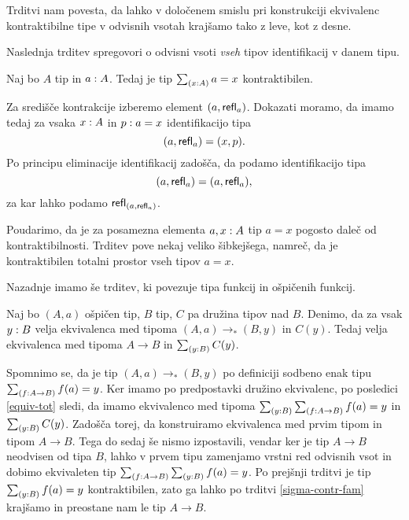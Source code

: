 Trditvi nam povesta, da lahko v določenem smislu pri konstrukciji ekvivalenc kontraktibilne tipe v odvisnih vsotah krajšamo tako z leve, kot z desne.

Naslednja trditev spregovori o odvisni vsoti \emph{vseh} tipov identifikacij v danem tipu.

\begin{trditev}
  \label{cover-contr}
  Naj bo \(A\) tip in \(a : A\). Tedaj je tip \(\textstyle \sum_{\left( x : A \right)} a = x\) kontraktibilen.
\end{trditev}

\begin{dokaz}
  Za središče kontrakcije izberemo element \((a, \textnormal{\textsf{refl}}_{a})\). Dokazati moramo, da imamo tedaj za vsaka \(x : A\) in \(p : a = x\) identifikacijo tipa
  \[(a, \textnormal{\textsf{refl}}_{a}) = (x, p).\]
  Po principu eliminacije identifikacij zadošča, da podamo identifikacijo tipa
  \[(a, \textnormal{\textsf{refl}}_{a}) = (a, \textnormal{\textsf{refl}}_{a}),\] za kar lahko podamo \(\textnormal{\textsf{refl}}_{(a, \textnormal{\textsf{refl}}_{a})}\).
\end{dokaz}

Poudarimo, da je za posamezna elementa \(a, x : A\) tip \(a = x\) pogosto daleč od kontraktibilnosti. Trditev pove nekaj veliko šibkejšega, namreč, da je kontraktibilen totalni prostor vseh tipov \(a = x\).

Nazadnje imamo še trditev, ki povezuje tipa funkcij in ošpičenih funkcij.

\begin{trditev}
  \label{pointed-map-family}
  Naj bo \((A, a)\) ošpičen tip, \(B\) tip, \(C\) pa družina tipov nad \(B\).
  Denimo, da za vsak \(y : B\) velja ekvivalenca med tipoma \((A, a) \to_{\ast} (B, y)\) in \(C(y)\). Tedaj velja ekvivalenca med tipoma \(A \to B\) in \(\textstyle \sum_{\left( y : B \right)} C(y)\).
\end{trditev}

\begin{dokaz}
  Spomnimo se, da je tip \((A, a) \to_{\ast} (B, y)\) po definiciji sodbeno enak tipu \(\textstyle \sum_{\left( f : A \to B \right)} f(a) = y\). Ker imamo po predpostavki družino ekvivalenc, po posledici \ref{equiv-tot} sledi, da imamo ekvivalenco med tipoma \(\textstyle \sum_{\left( y : B \right)} \textstyle \sum_{\left( f : A \to B \right)} f(a) = y\) in \(\textstyle \sum_{\left( y : B \right)} C(y)\).
  Zadošča torej, da konstruiramo ekvivalenca med prvim tipom in tipom \(A \to B\).
  Tega do sedaj še nismo izpostavili, vendar ker je tip \(A \to B\) neodvisen od tipa \(B\), lahko v prvem tipu zamenjamo vrstni red odvisnih vsot in dobimo ekvivaleten tip \(\textstyle \sum_{\left( f : A \to B \right)} \textstyle \sum_{\left( y : B \right)} f(a) = y\). Po prejšnji trditvi je tip \(\textstyle \sum_{\left( y : B \right)} f(a) = y\) kontraktibilen, zato ga lahko po trditvi \ref{sigma-contr-fam} krajšamo in preostane nam le tip \(A \to B\).
\end{dokaz}

